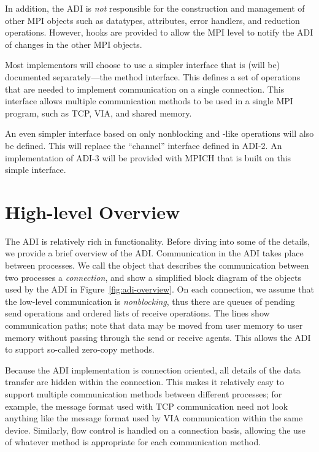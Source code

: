 In addition, the ADI is \emph{not} responsible for the construction
and management of other MPI objects such as datatypes, attributes,
error handlers, and reduction operations.  However, hooks are provided to
allow the MPI level to notify the ADI of changes in the other MPI objects.

Most implementors will choose to use a simpler interface that is
(will be) documented separately---the method interface.  This defines
a set of operations that are needed to implement communication on a
single connection.  This interface allows multiple communication
methods to be used in a single MPI program, such as TCP, VIA, and
shared memory.  

An even simpler interface based on only nonblocking  and
-like operations will also be defined.  This will replace
the ``channel'' interface defined in ADI-2.  An implementation of
ADI-3 will be provided with MPICH that is built on this simple interface.

\section{High-level Overview}
\label{sec:high-level}

The ADI is relatively rich in functionality.  Before diving into some of the
details, we provide a brief overview of the ADI.
Communication in the ADI takes place between processes.  We call the object
that describes the communication between two processes a \emph{connection},
and show a simplified block diagram of the objects used by the ADI in
Figure~\ref{fig:adi-overview}.
On each connection, we assume that the low-level communication is
\emph{nonblocking}, thus there are queues of pending send operations and
ordered lists of receive operations.  The lines show communication paths; note
that data may be moved from user memory to user memory without passing through
the send or receive agents.  This allows the ADI to support so-called
zero-copy methods.

Because the ADI implementation is connection oriented, all details of the data
transfer are hidden within the connection.  This makes it relatively easy to
support multiple communication methods between different processes; for
example, the message format used with TCP communication need not look anything
like the message format used by VIA communication within the same device.
Similarly, flow control is handled on a connection basis, allowing the use of
whatever method is appropriate for each communication method.
%

